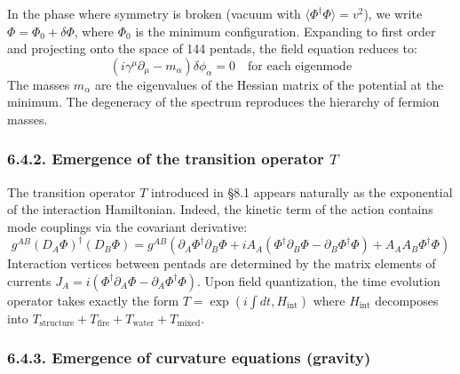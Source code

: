 \documentclass[11pt]{article}
\begin{document}
In the phase where symmetry is broken (vacuum with
\(\langle \Phi^\dagger \Phi \rangle = v^2\)), we write
\(\Phi = \Phi_0 + \delta\Phi\), where \(\Phi_0\) is the minimum
configuration. Expanding to first order and projecting onto the space of
144 pentads, the field equation reduces to: \[
(i\gamma^\mu \partial_\mu - m_{\alpha}) \delta\phi_\alpha = 0 \quad \text{for each eigenmode}
\] The masses \(m_\alpha\) are the eigenvalues of the Hessian matrix of
the potential at the minimum. The degeneracy of the spectrum reproduces
the hierarchy of fermion masses.

\hypertarget{emergence-of-the-transition-operator-t}{%
\subsubsection{\texorpdfstring{6.4.2. Emergence of the transition
operator
\(T\)}{6.4.2. Emergence of the transition operator T}}\label{emergence-of-the-transition-operator-t}}

The transition operator \(T\) introduced in §8.1 appears naturally as
the exponential of the interaction Hamiltonian. Indeed, the kinetic term
of the action contains mode couplings via the covariant derivative: \[
g^{AB} (D_A \Phi)^\dagger (D_B \Phi) = g^{AB} \left( \partial_A \Phi^\dagger \partial_B \Phi + i A_A (\Phi^\dagger \partial_B \Phi - \partial_B \Phi^\dagger \Phi) + A_A A_B \Phi^\dagger \Phi \right)
\] Interaction vertices between pentads are determined by the matrix
elements of currents
\(J_A = i(\Phi^\dagger \partial_A \Phi - \partial_A \Phi^\dagger \Phi)\).
Upon field quantization, the time evolution operator takes exactly the
form \(T = \exp(i \int dt , H_{\text{int}})\) where \(H_{\text{int}}\)
decomposes into
\(T_{\text{structure}} + T_{\text{fire}} + T_{\text{water}} + T_{\text{mixed}}\).

\hypertarget{emergence-of-curvature-equations-gravity}{%
\subsubsection{6.4.3. Emergence of curvature equations
(gravity)}\label{emergence-of-curvature-equations-gravity}}
\end{document}
